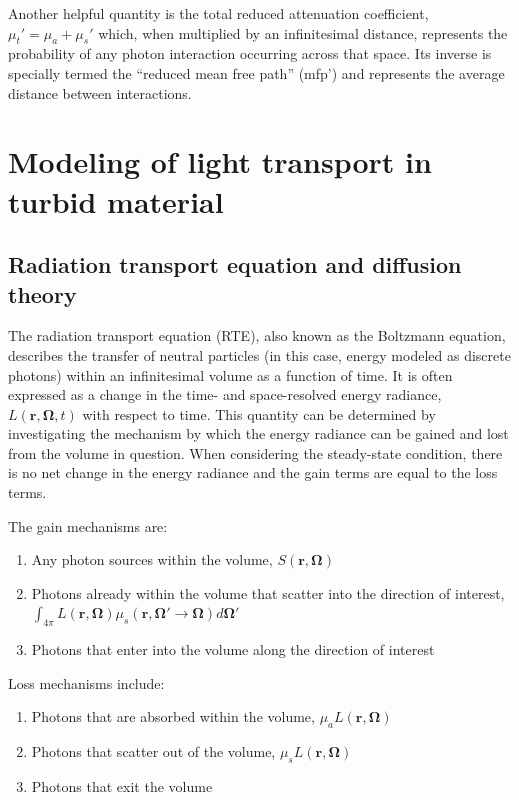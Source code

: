 Another helpful quantity is the total reduced attenuation coefficient, $\mu_t'=\mu_a + \mu_s'$ which, when multiplied by an infinitesimal distance, represents the probability of any photon interaction occurring across that space. Its inverse is specially termed the ``reduced mean free path'' (mfp') and represents the average distance between interactions.\cite{Farrell2003}

\section{Modeling of light transport in turbid material}

\subsection{Radiation transport equation and diffusion theory}
The radiation transport equation (RTE), also known as the Boltzmann equation, describes the transfer of neutral particles (in this case, energy modeled as discrete photons) within an infinitesimal volume as a function of time.\cite{Duderstadt1976} It is often expressed as a change in the time- and space-resolved energy radiance, $L(\mathbf{r},\mathbf{\Omega},t)$ with respect to time. This quantity can be determined by investigating the mechanism by which the energy radiance can be gained and lost from the volume in question. When considering the steady-state condition, there is no net change in the energy radiance and the gain terms are equal to the loss terms.

\noindent The gain mechanisms are:
\begin{enumerate}
	\item Any photon sources within the volume, $ S(\mathbf{r},\mathbf{\Omega}) $
	\item Photons already within the volume that scatter into the direction of interest,  $\int_{4\pi} L(\mathbf{r},\mathbf{\Omega}) \mu_s(\mathbf{r},\mathbf{\Omega}' \rightarrow \mathbf{\Omega}) d \mathbf{\Omega'} $
	\item Photons that enter into the volume along the direction of interest
\end{enumerate}

\noindent Loss mechanisms include:
\begin{enumerate}
	\item Photons that are absorbed within the volume, $ \mu_a L(\mathbf{r},\mathbf{\Omega}) $
	\item Photons that scatter out of the volume, $ \mu_s L(\mathbf{r},\mathbf{\Omega}) $
	\item Photons that exit the volume
\end{enumerate}

